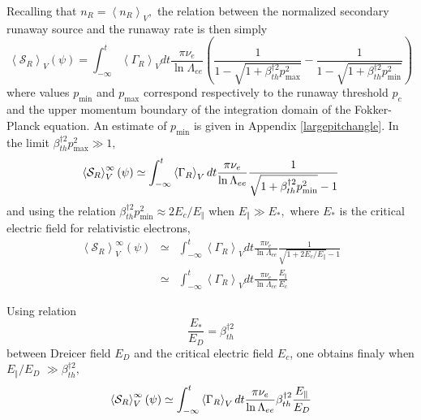 Recalling that $n_{R}=\left\langle n_{R}\right\rangle _{V},$ the relation
between the normalized secondary runaway source and the runaway rate is then
simply
\begin{equation}
\left\langle \mathcal{S}_{R}\right\rangle _{V}\left( \psi \right)
=\int_{-\infty }^{t}\left\langle \Gamma _{R}\right\rangle _{V}dt\frac{\pi
\nu _{e}}{\ln \Lambda _{ee}}\left( \frac{1}{1-\sqrt{1+\beta _{th}^{\dag
2}p_{\max }^{2}}}-\frac{1}{1-\sqrt{1+\beta _{th}^{\dag 2}p_{\min }^{2}}}%
\right)
\end{equation}
where values $p_{\min }$ and $p_{\max }$ correspond respectively to the
runaway threshold $p_{c}$ and the upper momentum boundary of the integration
domain of the Fokker-Planck equation. An estimate of $p_{\min }$ is given in
Appendix \ref{largepitchangle}. In the limit $\beta _{th}^{\dag 2}p_{\max
}^{2}\gg 1,$
\begin{equation}
\left\langle \mathcal{S}_{R}\right\rangle _{V}^{\infty }\left( \psi \right)
\simeq \int_{-\infty }^{t}\left\langle \Gamma _{R}\right\rangle _{V}dt\frac{%
\pi \nu _{e}}{\ln \Lambda _{ee}}\frac{1}{\sqrt{1+\beta _{th}^{\dag 2}p_{\min
}^{2}}-1}
\end{equation}
and using the relation $\beta _{th}^{\dag 2}p_{\min }^{2}\approx
2E_{c}/E_{\Vert }$ when $E_{\Vert }\gg E_{*},$ where $E_{*}$ is the critical
electric field for relativistic electrons,
\begin{eqnarray}
\left\langle \mathcal{S}_{R}\right\rangle _{V}^{\infty }\left( \psi \right)
&\simeq &\int_{-\infty }^{t}\left\langle \Gamma _{R}\right\rangle _{V}dt%
\frac{\pi \nu _{e}}{\ln \Lambda _{ee}}\frac{1}{\sqrt{1+2E_{c}/E_{\Vert }}-1}
\nonumber \\
&\simeq &\int_{-\infty }^{t}\left\langle \Gamma _{R}\right\rangle _{V}dt%
\frac{\pi \nu _{e}}{\ln \Lambda _{ee}}\frac{E_{\Vert }}{E_{c}}
\end{eqnarray}

Using relation
\begin{equation}
\frac{E_{*}}{E_{D}}=\beta _{th}^{\dag 2}
\end{equation}
between Dreicer field $E_{D}$ and the critical electric field $E_{c}$, one
obtains finaly when $E_{\Vert }/E_{D}$ $\gg \beta _{th}^{\dag 2},$
\begin{equation}
\left\langle \mathcal{S}_{R}\right\rangle _{V}^{\infty }\left( \psi \right)
\simeq \int_{-\infty }^{t}\left\langle \Gamma _{R}\right\rangle _{V}dt\frac{%
\pi \nu _{e}}{\ln \Lambda _{ee}}\beta _{th}^{\dag 2}\frac{E_{\Vert }}{E_{D}}
\end{equation}

